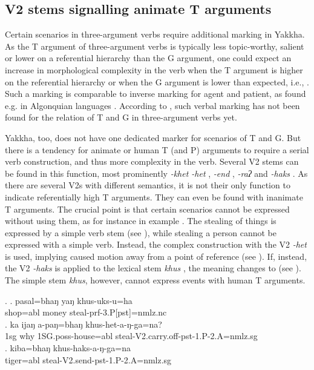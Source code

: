 \subsection{V2 stems signalling animate T arguments}\label{t-sap}

Certain scenarios in three-argument verbs require additional marking in Yakkha. As the T argument of three-argument verbs is typically less topic-worthy, salient or lower on a referential hierarchy than the G argument, one could expect an increase in morphological complexity in the verb when the T argument is higher on the referential hierarchy or when the G argument is lower than expected, i.e.,  \citep[128]{Comrie1989Language}. Such a marking is comparable to inverse marking for agent and patient, as found e.g. in Algonquian languages \citep{Zuniga2007_From}. According to \citet[90ff]{Haspelmath2007Ditransitive}, such verbal marking has not been found  for the relation of T and G in three-argument verbs yet. 

Yakkha, too, does not have one dedicated marker for  scenarios of T and G. But there is a tendency for animate or human T (and P) arguments to require a serial verb construction, and thus more complexity in the verb. Several V2 stems  can be found in this function, most prominently \emph{-khet \ti -het} , \emph{-end} , \emph{-raʔ}  and \emph{-haks} . As there are several V2s  with different semantics, it is not their only function to indicate referentially high T arguments. They can even be found with inanimate T arguments. The crucial point is that certain scenarios cannot be expressed without using them, as for instance in example \Next. The stealing of things is expressed by a simple verb stem (see \Next[a]), while stealing a person cannot be expressed with a simple verb. Instead, the complex construction with the V2 \emph{-het}  is used, implying caused motion away from a point of reference  (see \Next[b]). If, instead, the V2 \emph{-haks}  is applied to the lexical stem \emph{khus} , the meaning changes to  (see \Next[c]). The simple stem \emph{khus}, however, cannot express events with human T arguments.


\ex. \ag. pasal=bhaŋ yaŋ khus-uks-u=ha\\
		shop{\sc =abl} money steal{\sc -prf-3.P[pst]=nmlz.nc}	\\
 	\bg.  ka ijaŋ a-paŋ=bhaŋ khus-het-a-ŋ-ga=na?\\ 
	{\sc 1sg} why {\sc 1SG.poss-}house{\sc =abl} steal{\sc -V2.carry.off-pst-1.P-2.A=nmlz.sg}		\\
	\bg.  kiba=bhaŋ khus-haks-a-ŋ-ga=na\\ 
tiger{\sc =abl} steal{\sc -V2.send-pst-1.P-2.A=nmlz.sg}		\\
	

